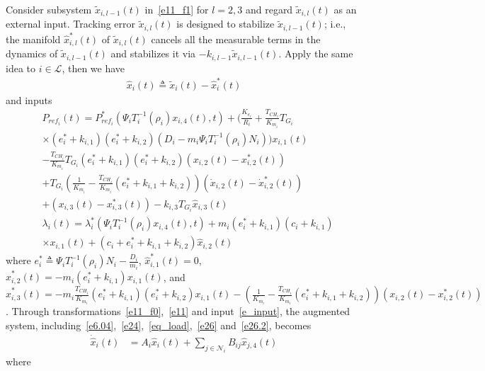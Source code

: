\documentclass[journal]{IEEEtran}
\newcommand{\lbd}{{\lambda}}
\newcommand{\nnum}{\nonumber}
\newcommand{\LL}{{\mathcal{L}}}
\newcommand{\NN}{{\mathcal{N}}}
\begin{document}
Consider subsystem $\tilde{x}_{i,l-1}(t)$ in~\eqref{e11_f1} for $l=2,3$ and regard $\tilde{x}_{i,l}(t)$ as an external input. Tracking error $\tilde{x}_{i,l}(t)$ is designed to stabilize $\tilde{x}_{i,l-1}(t)$; i.e., the manifold $\hat{x}_{i,l}^*(t)$ of $\tilde{x}_{i,l}(t)$ cancels all the measurable terms in the dynamics of $\tilde{x}_{i,l-1}(t)$ and stabilizes it via $-k_{i,l-1}\tilde{x}_{i,l-1}(t)$. Apply the same idea to $i \in \LL$, then we have  \begin{align} \hat{x}_i(t) \triangleq  \tilde{x}_i(t)-\hat{x}_i^{*}(t) \label{e11} \end{align} and inputs \begin{align} &P_{ref_i}(t) = P_{ref_i}^*(\Psi_{i}T_i^{-1}(\rho_i)x_{i,4}(t),t)+(\frac{K_{e_i}}{R_i}+\frac{T_{CH_i}}{K_{m_i}}T_{G_i}\nnum\\ &\times (e^*_i+k_{i,1})(e^*_i+k_{i,2})(D_i-m_i\Psi_iT_i^{-1}(\rho_i)N_i))x_{i,1}(t)\nnum\\ &-\frac{T_{CH_i}}{K_{m_i}}T_{G_i}(e^*_i+k_{i,1})(e^*_i+k_{i,2})(x_{i,2}(t)-x_{i,2}^*(t))\nnum\\ &+T_{G_i}(\frac{1}{K_{m_i}}-\frac{T_{CH_i}}{K_{m_i}}(e^*_i+k_{i,1}+k_{i,2}))(\dot{x}_{i,2}(t)-\dot{x}_{i,2}^*(t))\nnum\\ &+ (x_{i,3}(t)-x_{i,3}^*(t))-k_{i,3}T_{G_i}\hat{x}_{i,3}(t)\nnum\\ &\lbd_i(t)=\lbd_i^*(\Psi_{i}T_i^{-1}(\rho_i)x_{i,4}(t),t)+m_i (e^*_i+k_{i,1})(c_i+k_{i,1})\nnum\\ &\times x_{i,1}(t)+(c_i+e^*_i+k_{i,1}+k_{i,2})\hat{x}_{i,2}(t) \label{e_input} \end{align} where $e_i^* \triangleq \Psi_iT_i^{-1}(\rho_i)N_i-\frac{D_i}{m_i}$, $\hat{x}_{i,1}^*(t)=0$, $\hat{x}_{i,2}^*(t) = -m_i (e^*_i+k_{i,1}) x_{i,1}(t)$, and $\hat{x}_{i,3}^*(t)=-m_i\frac{T_{CH_i}}{K_{m_i}}(e^*_i+k_{i,1}) (e^*_i+k_{i,2}) x_{i,1}(t)- (\frac{1}{K_{m_i}}- \frac{T_{CH_i}}{K_{m_i}}(e^*_i+k_{i,1}+k_{i,2}))(x_{i,2}(t)-x_{i,2}^*(t))$. Through transformations~\eqref{e11_f0},~\eqref{e11} and input~\eqref{e_input}, the augmented system, including~\eqref{e6.04},~\eqref{e24},~\eqref{eq_load},~\eqref{e26} and~\eqref{e26.2}, becomes
\begin{align}
\dot{\hat{x}}_{i}(t)&=A_i\hat{x}_{i}(t) + \sum_{j \in {{\NN}}_i}B_{ij}\hat{x}_{j,4}(t)
\label{e_result_1}
\end{align}
where
\end{document}

